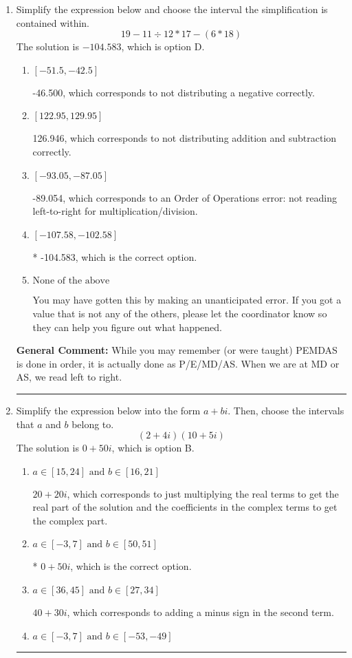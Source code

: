 \documentclass{extbook}[14pt]
\newcommand{\litem}[1]{\item #1

\rule{\textwidth}{0.4pt}}
\begin{document}
\begin{enumerate}\litem{
Simplify the expression below and choose the interval the simplification is contained within.
\[ 19 - 11 \div 12 * 17 - (6 * 18) \]
The solution is \( -104.583 \), which is option D.\begin{enumerate}[label=\Alph*.]
\item \( [-51.5, -42.5] \)

 -46.500, which corresponds to not distributing a negative correctly.
\item \( [122.95, 129.95] \)

 126.946, which corresponds to not distributing addition and subtraction correctly.
\item \( [-93.05, -87.05] \)

 -89.054, which corresponds to an Order of Operations error: not reading left-to-right for multiplication/division.
\item \( [-107.58, -102.58] \)

* -104.583, which is the correct option.
\item \( \text{None of the above} \)

 You may have gotten this by making an unanticipated error. If you got a value that is not any of the others, please let the coordinator know so they can help you figure out what happened.
\end{enumerate}

\textbf{General Comment:} While you may remember (or were taught) PEMDAS is done in order, it is actually done as P/E/MD/AS. When we are at MD or AS, we read left to right.
}
\litem{
Simplify the expression below into the form $a+bi$. Then, choose the intervals that $a$ and $b$ belong to.
\[ (2 + 4 i)(10 + 5 i) \]
The solution is \( 0 + 50 i \), which is option B.\begin{enumerate}[label=\Alph*.]
\item \( a \in [15, 24] \text{ and } b \in [16, 21] \)

 $20 + 20 i$, which corresponds to just multiplying the real terms to get the real part of the solution and the coefficients in the complex terms to get the complex part.
\item \( a \in [-3, 7] \text{ and } b \in [50, 51] \)

* $0 + 50 i$, which is the correct option.
\item \( a \in [36, 45] \text{ and } b \in [27, 34] \)

 $40 + 30 i$, which corresponds to adding a minus sign in the second term.
\item \( a \in [-3, 7] \text{ and } b \in [-53, -49] \)


\end{enumerate}}
\end{enumerate}
\end{document}
